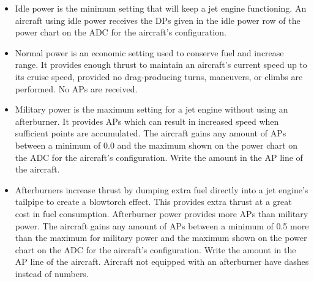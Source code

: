 \begin{itemize}
    \item{} Idle power is the minimum setting that will keep a jet engine functioning. An aircraft using idle power receives the DPs given in the idle power row of the power chart on the ADC for the aircraft's configuration.


    \item{} Normal power is an economic setting used to conserve fuel and increase range. It provides enough thrust to maintain an aircraft's current speed up to its cruise speed, provided no drag-producing turns, maneuvers, or climbs are performed. No APs are received.

    \item{} Military power is the maximum setting for a jet engine without using an afterburner. It provides APs which can result in increased speed when sufficient points are accumulated. The aircraft gains any amount of APs between a minimum of 0.0 and the maximum shown on the power chart on the ADC for the aircraft's configuration. Write the amount in the AP line of the aircraft.

    \item{} Afterburners increase thrust by dumping extra fuel directly into a jet engine's tailpipe to create a blowtorch effect. This provides extra thrust at a great cost in fuel consumption. Afterburner power provides more APs than military power. The aircraft gains any amount of APs between a minimum of 0.5 more than the maximum for military power and the maximum shown on the power chart on the ADC for the aircraft's configuration. Write the amount in the AP line of the aircraft. Aircraft not equipped with an afterburner have dashes instead of numbers.


\end{itemize}

